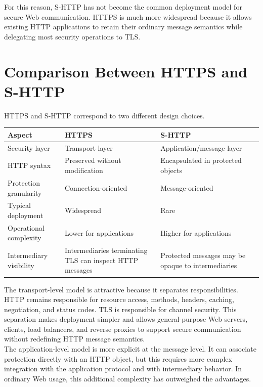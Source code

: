 \documentclass{scrbook}
\begin{document}
For this reason, S-HTTP has not become the common deployment model for secure Web communication. HTTPS is much more widespread because it allows existing HTTP applications to retain their ordinary message semantics while delegating most security operations to TLS.

\section{Comparison Between HTTPS and S-HTTP}

HTTPS and S-HTTP correspond to two different design choices.

\begin{center}
\begin{tabular}{p{} p{} p{}}
\textbf{Aspect} & \textbf{HTTPS} & \textbf{S-HTTP} \\
\hline

Security layer & Transport layer & Application/message layer \\ \hline

HTTP syntax & Preserved without modification & Encapsulated in protected objects \\ \hline

Protection granularity & Connection-oriented & Message-oriented \\ \hline

Typical deployment & Widespread & Rare \\ \hline

Operational complexity & Lower for applications & Higher for applications \\ \hline

Intermediary visibility & Intermediaries terminating TLS can inspect HTTP messages & Protected messages may be opaque to intermediaries \\ \hline
\end{tabular}
\end{center}

The transport-level model is attractive because it separates responsibilities. HTTP remains responsible for resource access, methods, headers, caching, negotiation, and status codes. TLS is responsible for channel security. This separation makes deployment simpler and allows general-purpose Web servers, clients, load balancers, and reverse proxies to support secure communication without redefining HTTP message semantics.\\

The application-level model is more explicit at the message level. It can associate protection directly with an HTTP object, but this requires more complex integration with the application protocol and with intermediary behavior. In ordinary Web usage, this additional complexity has outweighed the advantages.
\end{document}

